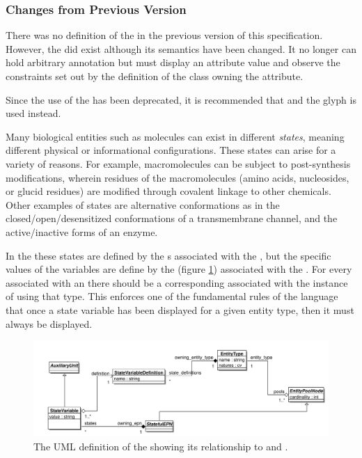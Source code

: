 \subsubsection{Changes from Previous Version}

There was no definition of the  in the
previous version of this specification. However, the  did exist although its semantics have been changed. It
no longer can hold arbitrary annotation but must display an attribute
value and observe the constraints set out by the definition of the
class owning the attribute.

Since the use of the  has been deprecated,
it is recommended that  and the
 glyph is used instead.

\label{defn:StateVariable}

Many biological entities such as molecules can exist in different
\emph{states}, meaning different physical or informational
configurations.  These states can arise for a variety of reasons.  For
example, macromolecules can be subject to post-synthesis
modifications, wherein residues of the macromolecules (amino acids,
nucleosides, or glucid residues) are modified through covalent linkage
to other chemicals.  Other examples of states are alternative
conformations as in the closed/open/desensitized conformations of a
transmembrane channel, and the active/inactive forms of an enzyme.

In the \PDl these states are defined by the
s associated with the
, but the specific values of the variables are
define by the  (figure
\ref{fig:techref:statevariableviewuml}) associated with the
. For every
 associated with an
 there should be a corresponding
 associated with the instance of
 using that type. This enforces one of the
fundamental rules of the language that once a state variable has been
displayed for a given entity type, then it must always be displayed.

\begin{figure}[htb]
  \centering
  \includegraphics[width = \textwidth]{images/statevariableviewuml}
  \caption{The UML definition of the  showing
    its relationship to  and .}
  \label{fig:techref:statevariableviewuml}
\end{figure}

